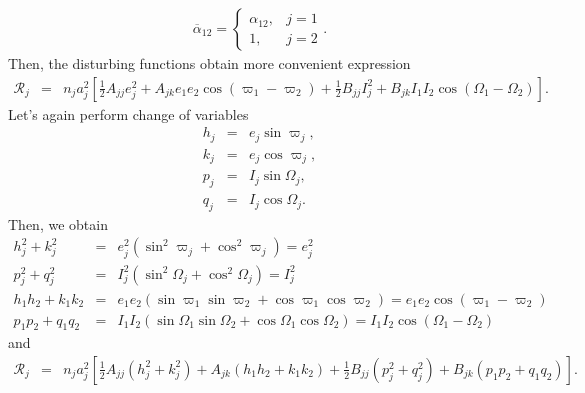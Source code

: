 \documentclass [12pt, a4paper] {article}
\begin{document}
\begin {eqnarray}
    \overline\alpha_{12} 
    =
    \left\{
        \begin {array}{ll}
            \alpha_{12}, & j=1
            \\
            1, & j=2
        \end {array}
    \right..
\end {eqnarray}
Then, the disturbing functions obtain more convenient expression 
\begin {eqnarray}
    \mathcal{R}_j
    &=& 
    n_ja_j^2
    \left[
        \frac{1}{2}A_{jj}e_j^2 
        +
        A_{jk}e_1e_2\cos(\varpi_1 - \varpi_2)
        +
        \frac{1}{2}
        B_{jj}I_j^2 
        +
        B_{jk}I_1I_2\cos(\Omega_1 - \Omega_2)
    \right].
\end {eqnarray}
Let's again perform change of variables
\begin {eqnarray}
    h_j 
    &=& 
    e_j\sin\varpi_j,
    \\
    k_j
    &=& 
    e_j\cos\varpi_j,
    \\
    p_j
    &=& 
    I_j\sin\Omega_j,
    \\
    q_j
    &=& 
    I_j\cos\Omega_j.
\end {eqnarray}
Then, we obtain
\begin {eqnarray}
    \label{eq:hkpq_corollaries1}
    h_j^2 + k_j^2 
    &=& 
    e_j^2(\sin^2\varpi_j +  \cos^2\varpi_j)
    = 
    e_j^2
    \\
    \label{eq:hkpq_corollaries2}
    p_j^2 + q_j^2 
    &=& 
    I_j^2(\sin^2\Omega_j + \cos^2\Omega_j)
    = 
    I_j^2
    \\
    \label{eq:hkpq_corollaries3}
    h_1h_2 + k_1k_2
    &=& 
    e_1e_2(\sin\varpi_1\sin\varpi_2 + \cos\varpi_1\cos\varpi_2)
    =
    e_1e_2\cos(\varpi_1 - \varpi_2)
    \\
    \label{eq:hkpq_corollaries4}
    p_1p_2 + q_1q_2 
    &=& 
    I_1I_2(\sin\Omega_1\sin\Omega_2 + \cos\Omega_1\cos\Omega_2)
    = 
    I_1I_2\cos(\Omega_1 - \Omega_2)
\end {eqnarray}
and 
\begin {eqnarray}
    \mathcal{R}_j 
    &=&
    n_ja_j^2
    \left[
        \frac{1}{2}A_{jj}(h_j^2 + k_j^2)
        +
        A_{jk}(h_1h_2 + k_1k_2)
        +
        \frac{1}{2}
        B_{jj}(p_j^2 + q_j^2)
        +
        B_{jk}(p_1p_2 + q_1q_2)
    \right].
\end {eqnarray}
\end{document}
